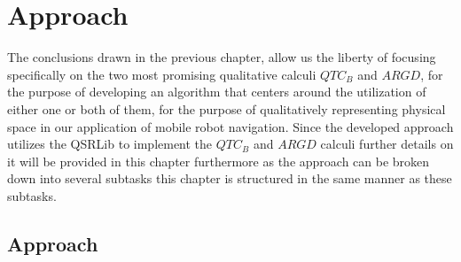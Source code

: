 
\chapter{Approach}
The conclusions drawn in the previous chapter, allow us the liberty of focusing specifically on the two most promising qualitative calculi $QTC_B$ and $ARGD$, for the purpose of developing an algorithm that centers around the utilization of either one or both of them, for the purpose of qualitatively representing physical space in our application of mobile robot navigation. Since the developed approach utilizes the QSRLib to implement the $QTC_B$ and $ARGD$ calculi further details on it will be provided in this chapter furthermore as the approach can be broken down into several subtasks this chapter is structured in the same manner as these subtasks.



\section{Approach}

